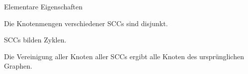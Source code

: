 \begin{frame}{Elementare Eigenschaften}
	\begin{block}{}
		    Die Knotenmengen verschiedener SCCs sind disjunkt.
	\end{block}

	\begin{block}{}
		    SCCs bilden Zyklen.
	\end{block}

	\begin{block}{}
		    Die Vereinigung aller Knoten aller SCCs ergibt alle Knoten
			des ursprünglichen Graphen.
	\end{block}
\end{frame}
